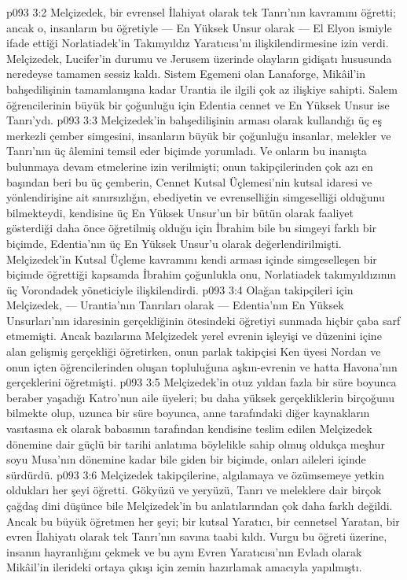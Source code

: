 \vs p093 3:2 Melçizedek, bir evrensel İlahiyat olarak tek Tanrı’nın kavramını öğretti; ancak o, insanların bu öğretiyle --- En Yüksek Unsur olarak --- El Elyon ismiyle ifade ettiği Norlatiadek’in Takımyıldız Yaratıcısı’nı ilişkilendirmesine izin verdi. Melçizedek, Lucifer’in durumu ve Jerusem üzerinde olayların gidişatı hususunda neredeyse tamamen sessiz kaldı. Sistem Egemeni olan Lanaforge, Mikâil’in bahşedilişinin tamamlanışına kadar Urantia ile ilgili çok az ilişkiye sahipti. Salem öğrencilerinin büyük bir çoğunluğu için Edentia cennet ve En Yüksek Unsur ise Tanrı’ydı.
\vs p093 3:3 Melçizedek’in bahşedilişinin arması olarak kullandığı üç eş merkezli çember simgesini, insanların büyük bir çoğunluğu insanlar, melekler ve Tanrı’nın üç âlemini temsil eder biçimde yorumladı. Ve onların bu inanışta bulunmaya devam etmelerine izin verilmişti; onun takipçilerinden çok azı en başından beri bu üç çemberin, Cennet Kutsal Üçlemesi’nin kutsal idaresi ve yönlendirişine ait sınırsızlığın, ebediyetin ve evrenselliğin simgeselliği olduğunu bilmekteydi, kendisine üç En Yüksek Unsur’un bir bütün olarak faaliyet gösterdiği daha önce öğretilmiş olduğu için İbrahim bile bu simgeyi farklı bir biçimde, Edentia’nın üç En Yüksek Unsur’u olarak değerlendirilmişti. Melçizedek’in Kutsal Üçleme kavramını kendi arması içinde simgeselleşen bir biçimde öğrettiği kapsamda İbrahim çoğunlukla onu, Norlatiadek takımyıldızının üç Vorondadek yöneticiyle ilişkilendirdi.
\vs p093 3:4 Olağan takipçileri için Melçizedek, --- Urantia’nın Tanrıları olarak --- Edentia’nın En Yüksek Unsurları’nın idaresinin gerçekliğinin ötesindeki öğretiyi sunmada hiçbir çaba sarf etmemişti. Ancak bazılarına Melçizedek yerel evrenin işleyişi ve düzenini içine alan gelişmiş gerçekliği öğretirken, onun parlak takipçisi Ken üyesi Nordan ve onun içten öğrencilerinden oluşan topluluğuna aşkın\hyp{}evrenin ve hatta Havona’nın gerçeklerini öğretmişti.
\vs p093 3:5 Melçizedek’in otuz yıldan fazla bir süre boyunca beraber yaşadığı Katro’nun aile üyeleri; bu daha yüksek gerçekliklerin birçoğunu bilmekte olup, uzunca bir süre boyunca, anne tarafındaki diğer kaynakların vasıtasına ek olarak babasının tarafından kendisine teslim edilen Melçizedek dönemine dair güçlü bir tarihi anlatıma böylelikle sahip olmuş oldukça meşhur soyu Musa’nın dönemine kadar bile giden bir biçimde, onları aileleri içinde sürdürdü.
\vs p093 3:6 Melçizedek takipçilerine, algılamaya ve özümsemeye yetkin oldukları her şeyi öğretti. Gökyüzü ve yeryüzü, Tanrı ve meleklere dair birçok çağdaş dini düşünce bile Melçizedek’in bu anlatılarından çok daha farklı değildi. Ancak bu büyük öğretmen her şeyi; bir kutsal Yaratıcı, bir cennetsel Yaratan, bir evren İlahiyatı olarak tek Tanrı’nın savına taabi kıldı. Vurgu bu öğreti üzerine, insanın hayranlığını çekmek ve bu aynı Evren Yaratıcısı’nın Evladı olarak Mikâil’in ilerideki ortaya çıkışı için zemin hazırlamak amacıyla yapılmıştı.
